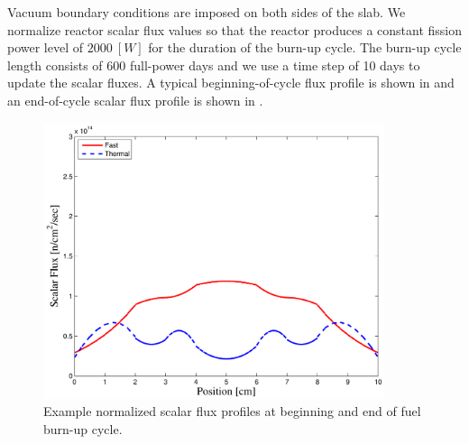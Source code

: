 Vacuum boundary conditions are imposed on both sides of the slab.  
We normalize reactor scalar flux values so that the reactor produces a constant fission power level of $2000~[W]$ for the duration of the burn-up cycle.
The burn-up cycle length consists of 600 full-power days and we use a time step of 10 days to update the scalar fluxes.
A typical beginning-of-cycle flux profile is shown in  and an end-of-cycle scalar flux profile is shown in .  
\begin{figure}[!htp]
\centering
\includegraphics[width=10cm]{chapter5_depletion/P1_Lobatto_full_80_cells_t_steps60_End_600_Power_2000__BOC_Flux.pdf}
\caption{Example normalized scalar flux profiles at beginning and end of fuel burn-up cycle.}
\label{fig:ex_boc_cycle}
\end{figure}

